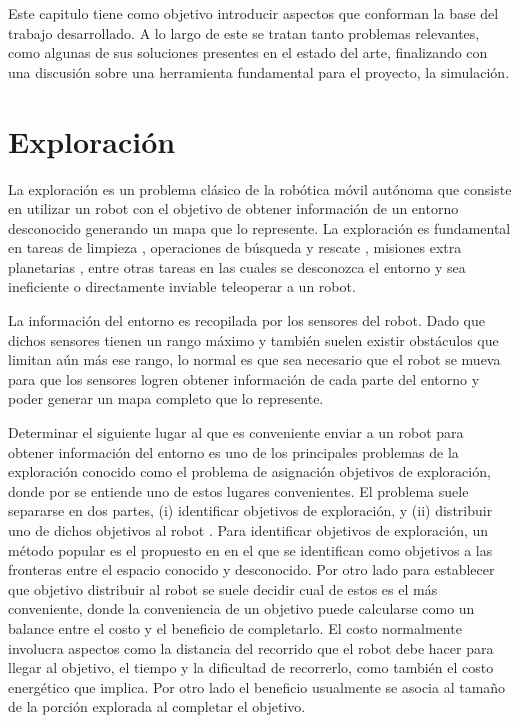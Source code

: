 Este capitulo tiene como objetivo introducir aspectos que conforman la base del
trabajo desarrollado. A lo largo de este se tratan tanto problemas relevantes,
como algunas de sus soluciones presentes en el estado del arte, finalizando con
una discusión sobre una herramienta fundamental para el proyecto, la
simulación.

\section{Exploración}\label{sec:exploracion}
La exploración es un problema clásico de la robótica
móvil autónoma que consiste en utilizar un robot con el objetivo de obtener
información de un entorno desconocido generando un mapa que lo represente. La
exploración es fundamental en tareas de limpieza \cite{luo2002real}, operaciones
de búsqueda y rescate \cite{Liu2015}, misiones extra planetarias
\cite{schuster2019towards}, entre otras tareas en las cuales se desconozca
el entorno y sea ineficiente o directamente inviable teleoperar a un robot.

La información del entorno es recopilada por los sensores del robot. Dado que
dichos sensores tienen un rango máximo y también suelen existir obstáculos que
limitan aún más ese rango, lo normal es que sea necesario que el robot se mueva
para que los sensores logren obtener información de cada parte del entorno y
poder generar un mapa completo que lo represente.

Determinar el siguiente lugar al que es conveniente enviar a un robot para
obtener información del entorno es uno de los principales problemas de la
exploración conocido como el problema de asignación objetivos de exploración,
donde por  se entiende uno de estos lugares
convenientes. El problema suele separarse en dos partes, (i) identificar
objetivos de exploración, y (ii) distribuir uno de dichos objetivos al robot
\cite{wurm2008coordinated}. Para identificar objetivos de exploración, un
método popular es el propuesto en \cite{yamauchi1998frontier} en el que se
identifican como objetivos a las fronteras entre el espacio conocido y
desconocido. Por otro lado para establecer que objetivo distribuir al robot se
suele decidir cual de estos es el más conveniente, donde la conveniencia de un
objetivo puede calcularse como un balance entre el costo y el beneficio de
completarlo. El costo normalmente involucra aspectos como la distancia del
recorrido que el robot debe hacer para llegar al objetivo, el tiempo y la
dificultad de recorrerlo, como también el costo energético que implica. Por
otro lado el beneficio usualmente se asocia al tamaño de la porción explorada
al completar el objetivo. 


